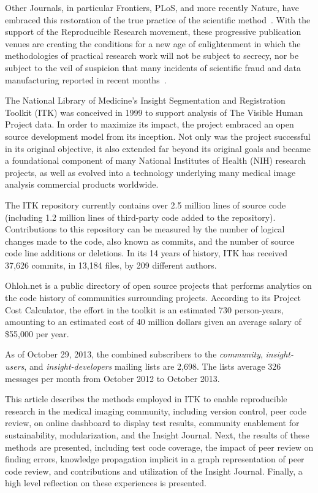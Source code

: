 \documentclass{frontiersENG} %
\begin{document}
Other Journals, in particular Frontiers, PLoS, and more recently Nature, have
embraced this restoration of the true practice of the scientific
method~\cite{NatureEditorial2013,NatureEditorial2012,Mobley2013}.  With the
support of the Reproducible Research movement, these progressive publication
venues are creating the conditions for a new age of enlightenment in which the
methodologies of practical research work will not be subject to secrecy, nor be
subject to the veil of suspicion that many incidents of scientific fraud and
data manufacturing reported in recent months~\cite{Sandve2013}.

The National Library of Medicine$’$s Insight Segmentation and Registration
Toolkit (ITK) was conceived in 1999 to support analysis of The Visible Human
Project data. In order to maximize its impact, the project embraced an open
source development model from its inception. Not only was the project
successful in its original objective, it also extended far beyond its original
goals and became a foundational component of many National Institutes of Health
(NIH) research projects, as well as evolved into a technology underlying many
medical image analysis commercial products worldwide.

%
%
The ITK repository currently contains over 2.5 million lines of source code
(including 1.2 million lines of third-party code added to the repository).
Contributions to this repository can be measured by the number of logical
changes made to the code, also known as commits, and the number of source code
line additions or deletions. In its 14 years of history, ITK has received
37,626 commits, in 13,184 files, by 209 different authors.

Ohloh.net \cite{OhlohITK2013} is a public directory of open source projects
that performs analytics on the code history of communities surrounding
projects. According to its Project Cost Calculator, the effort in the toolkit
is an estimated 730 person-years, amounting to an estimated cost of 40 million
dollars given an average salary of \$55,000 per year.

As of October 29, 2013, the combined subscribers to the \textit{community},
\textit{insight-users}, and \textit{insight-developers} mailing lists are 2,698.
The lists average 326 messages per month from October 2012 to October 2013.

This article describes the methods employed in ITK to enable reproducible
research in the medical imaging community, including version control, peer
code review, on online dashboard to display test results, community enablement
for sustainability, modularization, and the Insight Journal.  Next, the
results of these methods are presented, including test code coverage, the impact
of peer review on finding errors, knowledge propagation implicit in a graph
representation of peer code review, and contributions and utilization of the
Insight Journal.  Finally, a high level reflection on these experiences is
presented.
\end{document}
